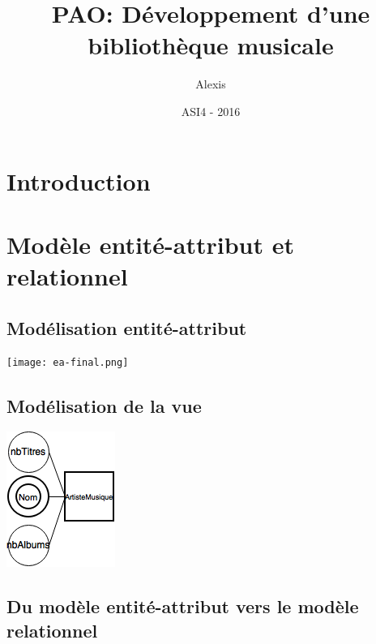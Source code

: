 \documentclass[a4paper,10pt, french]{report}
\title{PAO: Développement d'une bibliothèque musicale}
\author{Alexis \bsc{Durieux}}
\date{ASI4 - 2016}
\begin{document}
\maketitle
\tableofcontents

\chapter*{Introduction}

\chapter{Modèle entité-attribut et relationnel}
\section{Modélisation entité-attribut}
  \texttt{[image: ea-final.png]}
\section{Modélisation de la vue}
  \includegraphics[scale=0.5]{vues.png}
\section{Du modèle entité-attribut vers le modèle relationnel}
\end{document}
